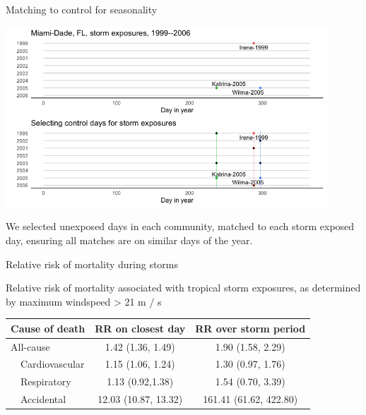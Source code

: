 \documentclass[ignorenonframetext,]{beamer}
\begin{document}
\begin{frame}{Matching to control for seasonality}

\begin{center}\includegraphics[width=0.9\textwidth]{example_picking_controls} \end{center}

\vspace{-0.3cm}

\small We selected unexposed days in each community, matched to each
storm exposed day, ensuring all matches are on similar days of the year.

\end{frame}

\begin{frame}{Relative risk of mortality during storms}

\centering
\small{Relative risk of mortality associated with tropical storm exposures, as determined by maximum windspeed > 21 m / s}

\begin{table}[]
\centering
\begin{tabular}{@{}lcc@{}}
\toprule
Cause of death & RR on closest day    & RR over storm period                                             \\ \midrule
All-cause      & 1.42 (1.36, 1.49)    & 1.90 (1.58, 2.29)      \\
\ \ Cardiovascular & 1.15 (1.06, 1.24)    & 1.30 (0.97, 1.76)      \\
\ \ Respiratory    & 1.13 (0.92,1.38)     & 1.54 (0.70, 3.39)      \\
\ \ Accidental     & 12.03 (10.87, 13.32) & 161.41 (61.62, 422.80) \\ \bottomrule
\end{tabular}
\end{table}

\end{frame}
\end{document}

